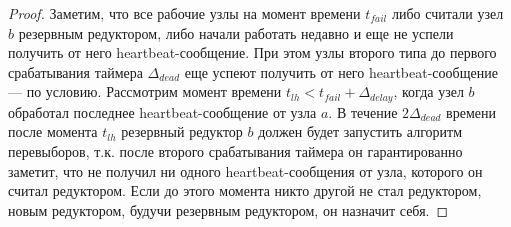 \documentclass{article}
\theoremstyle{plain}
\theoremstyle{plain}
\theoremstyle{plain}
\theoremstyle{plain}
\theoremstyle{definition}
\theoremstyle{remark}
\theoremstyle{plain}
\begin{document}
\begin{proof}
    Заметим, что все рабочие узлы на момент времени $t_{fail}$ либо считали узел $b$ резервным редуктором, либо начали работать недавно и еще не успели получить от него heartbeat-со\-об\-ще\-ние. При этом узлы второго типа до первого срабатывания таймера $\Delta_{dead}$ еще успеют получить от него heartbeat-со\-об\-ще\-ние --- по условию. Рассмотрим момент времени $t_{lh} < t_{fail} + \Delta_{delay}$, когда узел $b$ обработал последнее heartbeat-со\-об\-ще\-ние от узла $a$. В течение $2\Delta_{dead}$ времени после момента $t_{lh}$ резервный редуктор $b$ должен будет запустить алгоритм перевыборов, т.к. после второго срабатывания таймера он гарантированно заметит, что не получил ни одного heartbeat-со\-об\-ще\-ния от узла, которого он считал редуктором. Если до этого момента никто другой не стал редуктором, новым редуктором, будучи резервным редуктором, он назначит себя.
    

\end{proof}
\end{document}
